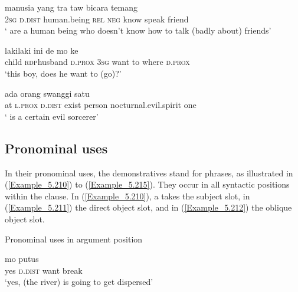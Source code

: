 \ea
\label{Example_5.207}
 {} {manusia} {yang} {tra} {taw} {bicara} {temang}\\ %
 \textsc{2sg}  \textsc{d.dist}  human.being  \textsc{rel}  \textsc{neg}  know  speak  friend\\
\glt 
‘\bluebold{)} are a human being who doesn’t know how to talk (badly about) friends’ \textstyleExampleSource{[081115-001a-Cv.0245]}
\z

\ea
\label{Example_5.208}
 {laki{\Tilde}laki} {ini} {de} {mo} {ke} {} {}\\ %
 child  \textsc{rdp}{\Tilde}husband  \textsc{d.prox}  \textsc{3sg}  want  to  where  \textsc{d.prox}\\
\glt 
‘this boy, \bluebold{)} does he want to (go)?’ \textstyleExampleSource{[080922-004-Cv.0017]}
\z

\ea
\label{Example_5.209}
 {} {} {ada} {orang} {swanggi} {satu}\\ %
 at  \textsc{l.prox}  \textsc{d.dist}  exist  person  nocturnal.evil.spirit  one\\
\glt
‘\bluebold{)} is a certain evil sorcerer’ \textstyleExampleSource{[081006-022-CvEx.0150]}
\z

\subsection{Pronominal uses}
\label{Para_5.6.2}
In their pronominal uses, the demonstratives stand for  phrases, as illustrated in (\ref{Example_5.210}) to (\ref{Example_5.215}). They occur in all syntactic positions within the clause. In (\ref{Example_5.210}), a  takes the subject slot, in (\ref{Example_5.211}) the direct object slot, and in (\ref{Example_5.212}) the oblique object slot.


\begin{styleExampleTitle}
Pronominal uses in argument position
\end{styleExampleTitle}

\ea
\label{Example_5.210}
 {} {mo} {putus}\\ %
 yes  \textsc{d.dist}  want  break\\
 ‘yes,  (the river) is going to get dispersed’ \textstyleExampleSource{[081006-033-Cv.0064]}
\z

